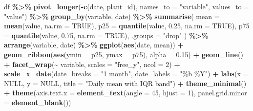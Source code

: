 \documentclass[
]{article}
\newenvironment{Shaded}{\begin{snugshade}}{\end{snugshade}}
\newcommand{\AttributeTok}[1]{\textcolor[rgb]{0.13,0.29,0.53}{#1}}
\newcommand{\ConstantTok}[1]{\textcolor[rgb]{0.56,0.35,0.01}{#1}}
\newcommand{\DecValTok}[1]{\textcolor[rgb]{0.00,0.00,0.81}{#1}}
\newcommand{\FloatTok}[1]{\textcolor[rgb]{0.00,0.00,0.81}{#1}}
\newcommand{\FunctionTok}[1]{\textcolor[rgb]{0.13,0.29,0.53}{\textbf{#1}}}
\newcommand{\NormalTok}[1]{#1}
\newcommand{\SpecialCharTok}[1]{\textcolor[rgb]{0.81,0.36,0.00}{\textbf{#1}}}
\newcommand{\StringTok}[1]{\textcolor[rgb]{0.31,0.60,0.02}{#1}}
\begin{document}
\begin{Shaded}
\begin{Highlighting}[]
\NormalTok{df }\SpecialCharTok{\%\textgreater{}\%}
  \FunctionTok{pivot\_longer}\NormalTok{(}\SpecialCharTok{{-}}\FunctionTok{c}\NormalTok{(date, plant\_id), }\AttributeTok{names\_to =} \StringTok{"variable"}\NormalTok{, }\AttributeTok{values\_to =} \StringTok{"value"}\NormalTok{) }\SpecialCharTok{\%\textgreater{}\%} 
  \FunctionTok{group\_by}\NormalTok{(variable, date) }\SpecialCharTok{\%\textgreater{}\%}
  \FunctionTok{summarise}\NormalTok{(}
    \AttributeTok{mean =} \FunctionTok{mean}\NormalTok{(value, }\AttributeTok{na.rm =} \ConstantTok{TRUE}\NormalTok{),}
    \AttributeTok{p25  =} \FunctionTok{quantile}\NormalTok{(value, }\FloatTok{0.25}\NormalTok{, }\AttributeTok{na.rm =} \ConstantTok{TRUE}\NormalTok{),}
    \AttributeTok{p75  =} \FunctionTok{quantile}\NormalTok{(value, }\FloatTok{0.75}\NormalTok{, }\AttributeTok{na.rm =} \ConstantTok{TRUE}\NormalTok{),}
    \AttributeTok{.groups =} \StringTok{"drop"}
\NormalTok{  ) }\SpecialCharTok{\%\textgreater{}\%}
  \FunctionTok{arrange}\NormalTok{(variable, date) }\SpecialCharTok{\%\textgreater{}\%} 
  \FunctionTok{ggplot}\NormalTok{(}\FunctionTok{aes}\NormalTok{(date, mean)) }\SpecialCharTok{+}
  \FunctionTok{geom\_ribbon}\NormalTok{(}\FunctionTok{aes}\NormalTok{(}\AttributeTok{ymin =}\NormalTok{ p25, }\AttributeTok{ymax =}\NormalTok{ p75), }\AttributeTok{alpha =} \FloatTok{0.15}\NormalTok{) }\SpecialCharTok{+}
  \FunctionTok{geom\_line}\NormalTok{() }\SpecialCharTok{+}
  \FunctionTok{facet\_wrap}\NormalTok{(}\SpecialCharTok{\textasciitilde{}}\NormalTok{ variable, }\AttributeTok{scales =} \StringTok{"free\_y"}\NormalTok{, }\AttributeTok{ncol =} \DecValTok{2}\NormalTok{) }\SpecialCharTok{+}
  \FunctionTok{scale\_x\_date}\NormalTok{(}\AttributeTok{date\_breaks =} \StringTok{"1 month"}\NormalTok{, }\AttributeTok{date\_labels =} \StringTok{"\%b \%Y"}\NormalTok{) }\SpecialCharTok{+}
  \FunctionTok{labs}\NormalTok{(}\AttributeTok{x =} \ConstantTok{NULL}\NormalTok{, }\AttributeTok{y =} \ConstantTok{NULL}\NormalTok{, }\AttributeTok{title =} \StringTok{"Daily mean with IQR band"}\NormalTok{) }\SpecialCharTok{+}
  \FunctionTok{theme\_minimal}\NormalTok{() }\SpecialCharTok{+}
  \FunctionTok{theme}\NormalTok{(}\AttributeTok{axis.text.x =} \FunctionTok{element\_text}\NormalTok{(}\AttributeTok{angle =} \DecValTok{45}\NormalTok{, }\AttributeTok{hjust =} \DecValTok{1}\NormalTok{),}
        \AttributeTok{panel.grid.minor =} \FunctionTok{element\_blank}\NormalTok{())}
\end{Highlighting}
\end{Shaded}
\end{document}
